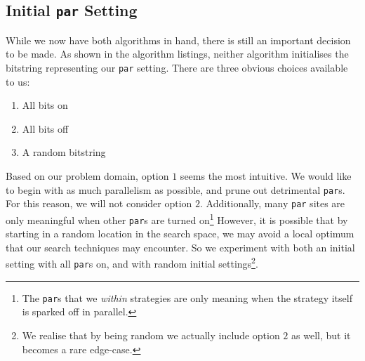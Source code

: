 \subsection{Initial \texttt{par} Setting}

While we now have both algorithms in hand, there is still an important decision
to be made. As shown in the algorithm listings, neither algorithm initialises
the bitstring representing our \verb|par| setting. There are three obvious
choices available to us:

\begin{enumerate}
    \item All bits on
    \item All bits off
    \item A random bitstring
\end{enumerate}

Based on our problem domain, option $1$ seems the most intuitive. We would like
to begin with as much parallelism as possible, and prune out detrimental
\verb|par|s. For this reason, we will not consider option $2$. Additionally,
many \verb|par| sites are only meaningful when other \verb|par|s are turned
on\footnote{The \texttt{par}s that we \emph{within} strategies are only meaning
when the strategy itself is sparked off in parallel.} However, it is possible
that by starting in a random location in the search space, we may avoid a local
optimum that our search techniques may encounter. So we experiment with both an
initial setting with all \verb|par|s on, and with random initial
settings\footnote{We realise that by being random we actually include option
$2$ as well, but it becomes a rare edge-case.}.
